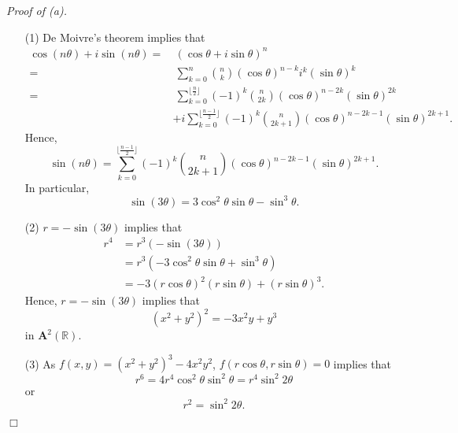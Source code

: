 \documentclass{article}
\begin{document}
\emph{Proof of (a).}
\begin{enumerate}
\item[(1)]
  De Moivre's theorem implies that
  \begin{align*}
    \cos(n\theta)+i \sin(n\theta)
    =& \: (\cos\theta + i\sin\theta)^n \\
    =& \: \sum_{k=0}^{n} {n \choose k} (\cos\theta)^{n-k} i^{k} (\sin\theta)^{k} \\
    =& \: \sum_{k=0}^{\lfloor \frac{n}{2} \rfloor}
      (-1)^k {n \choose 2k} (\cos\theta)^{n-2k} (\sin\theta)^{2k} \\
      &+ i \sum_{k=0}^{\lfloor \frac{n-1}{2} \rfloor}
      (-1)^k {n \choose 2k+1} (\cos\theta)^{n-2k-1} (\sin\theta)^{2k+1}.
  \end{align*}
  Hence,
  \[
    \sin(n\theta)
    = \sum_{k=0}^{\lfloor \frac{n-1}{2} \rfloor}
      (-1)^k {n \choose 2k+1} (\cos\theta)^{n-2k-1} (\sin\theta)^{2k+1}.
  \]
  In particular,
  \[
    \sin(3\theta)
    = 3 \cos^{2}\theta \sin\theta - \sin^{3}\theta.
  \]

\item[(2)]
  $r = -\sin(3\theta)$ implies that
  \begin{align*}
    r^4
    &= r^3(-\sin(3\theta)) \\
    &= r^3 (-3 \cos^{2}\theta \sin\theta + \sin^{3}\theta) \\
    &= -3 (r\cos\theta)^2 (r\sin\theta) + (r\sin\theta)^3.
  \end{align*}
  Hence, $r = -\sin(3\theta)$ implies that
  \[
    (x^2+y^2)^2 = -3x^2 y + y^3
  \]
  in $\mathbf{A}^2(\mathbb{R})$.

\item[(3)]
  As $f(x,y) = (x^2+y^2)^3 - 4x^2y^2$,
  $f(r\cos\theta,r\sin\theta) = 0$ implies that
  \[
    r^6
    = 4r^4 \cos^2\theta\sin^2\theta
    = r^4 \sin^2 2\theta
  \]
  or
  \[
    r^2 = \sin^2 2\theta.
  \]
\end{enumerate}
$\Box$ \\
\end{document}
